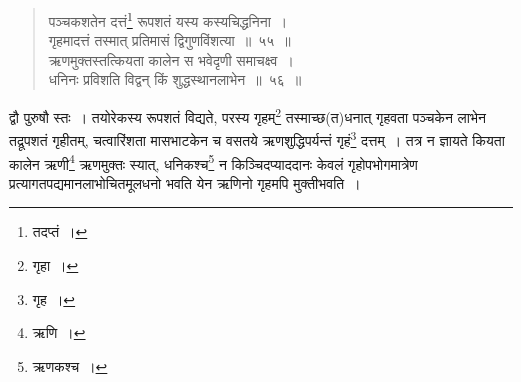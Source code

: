 \documentclass[10pt, openany]{book}
\begin{document}
{\vspace{0.3cm}{उदाहरणम्\textemdash}

\begin{quote}
    
{\eg  पञ्चकशतेन दत्तं\renewcommand{\thefootnote}{\s ११}\footnote{\s तदप्तं~।} रूपशतं यस्य कस्यचिद्धनिना~। \\
 गृहमादत्तं तस्मात् प्रतिमासं द्विगुणविंशत्या~॥~५५~॥ \\
 ऋणमुक्तस्तत्कियता कालेन स भवेदृणी समाचक्ष्व~। \\
 धनिनः प्रविशति विद्वन् किं शुद्धस्थानलाभेन~॥~५६~॥}\end{quote}

{द्वौ पुरुषौ स्तः~। तयोरेकस्य रूपशतं विद्यते, परस्य गृहम्\renewcommand{\thefootnote}{\s १२}\footnote{\s गृहा~।}
तस्माच्छ(त)धनात् गृहवता}
{पञ्चकेन लाभेन तद्रूपशतं गृहीतम्, चत्वारिंशता मासभाटकेन च वसतये
ऋणशुद्धिपर्यन्तं}
{गृहं\renewcommand{\thefootnote}{\s १३}\footnote{\s गृह~।} दत्तम्~। तत्र न ज्ञायते कियता कालेन ऋणी\renewcommand{\thefootnote}{\s १४}\footnote{\s ऋणि~।} ऋणमुक्तः
स्यात्, धनिकश्च\renewcommand{\thefootnote}{\s १५}\footnote{\s ऋणकश्च~।} न}
{किञ्चिदप्याददानः केवलं गृहोपभोगमात्रेण प्रत्यागतपद्यमानलाभोचितमूलधनो
भवति येन}
{ऋणिनो गृहमपि मुक्तीभवति~।}





\newpage

}
\end{document}
